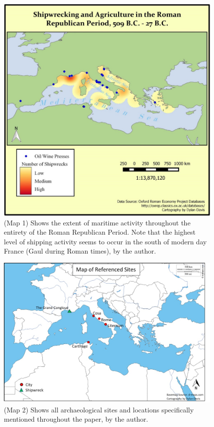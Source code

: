 	
	\begin{figure}[!p]
		\includegraphics[width=\linewidth]{figures/Davis_Agroeconomy_Map1.jpg}
		\centering
		\caption{(Map 1) Shows the extent of maritime activity throughout the entirety of the Roman Republican Period. Note that the highest level of shipping activity seems to occur in the south of modern day France (Gaul during Roman times), by the author.}
		\label{fig:DavisMap1}
	\end{figure}
	
	
	
	\begin{figure}[!p]
		\includegraphics[width=\linewidth]{figures/Davis_Agroeconomy_Map2.jpg}
		\centering
		\caption{(Map 2) Shows all archaeological sites and locations specifically mentioned throughout the paper, by the author.}
		\label{fig:DavisMap2}
	\end{figure}
	
